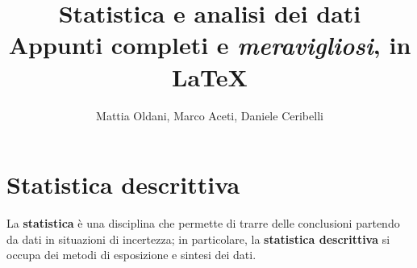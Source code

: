
\usetikzlibrary{positioning}
\usetikzlibrary{shapes.geometric}
\usepackage{mdframed}
\usepackage{amsthm}
\usepackage{mathtools}
\usepackage{framed}
\usetikzlibrary{patterns}
\usepackage{pdflscape}
\usepackage{rotating}
\usepackage{makecell}
\usepackage{pgfplots}

\usepackage{multirow}
\usepackage{tabularx}

\usepackage[yyyymmdd]{datetime}
\renewcommand{\dateseparator}{-}

\newtheorem*{teorema}{Teorema}
\newtheorem*{corollario}{Corollario}
\newtheorem*{dimostrazione}{Dimostrazione}
\newtheorem{proprieta}{Proprietà}
\newtheorem*{esempio}{Esempio}

\newcommand{\E}{\mathbb{E}}

\title{
Statistica e analisi dei dati \\
\small{Appunti completi e \textit{meravigliosi}, in \LaTeX}
}
\author{Mattia Oldani, Marco Aceti, Daniele Ceribelli}
\date{}
\pgfplotsset{compat=1.18}

\pagestyle{fancy}
\fancyhf{}
\rhead{\rightmark}
\lfoot{\thepage}



\maketitle

\renewcommand*\contentsname{Indice}
\tableofcontents



\newpage

\section{Statistica descrittiva}
La \textbf{statistica} è una disciplina che permette di trarre delle conclusioni partendo da dati in situazioni di incertezza; in particolare, la \textbf{statistica descrittiva} si occupa dei metodi di esposizione e sintesi dei dati.

